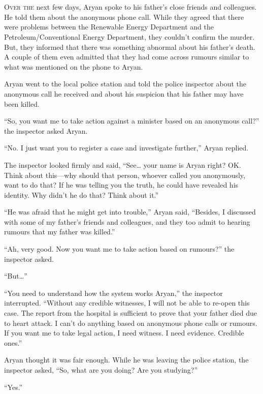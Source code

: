 \chapter{}

\lettrine{O}{ver the} next few days, Aryan spoke to his father's close friends and
colleagues. He told them about the anonymous phone call. While they agreed that
there were problems between the Renewable Energy Department and the
Petroleum/Conventional Energy Department, they couldn't confirm the murder. But,
they informed that there was something abnormal about his father's death. A
couple of them even admitted that they had come across rumours similar to what
was mentioned on the phone to Aryan.

Aryan went to the local police station and told the police inspector about the
anonymous call he received and about his suspicion that his father may have been
killed.

“So, you want me to take action against a minister based on an anonymous call?”
the inspector asked Aryan.

“No. I just want you to register a case and investigate further,” Aryan replied.

The inspector looked firmly and said, “See… your name is Aryan right? OK.
Think about this—why should that person, whoever called you anonymously, want
to do that? If he was telling you the truth, he could have revealed his
identity. Why didn't he do that? Think about it.”

“He was afraid that he might get into trouble,” Aryan said, “Besides, I
discussed with some of my father's friends and colleagues, and they too admit to
hearing rumours that my father was killed.”

“Ah, very good. Now you want me to take action based on rumours?” the inspector
asked.

“But…”

“You need to understand how the system works Aryan,” the inspector interrupted.
“Without any credible witnesses, I will not be able to re-open this case. The
report from the hospital is sufficient to prove that your father died due to
heart attack. I can't do anything based on anonymous phone calls or rumours. If
you want me to take legal action, I need witness. I need evidence. Credible
ones.”

Aryan thought it was fair enough. While he was leaving the police station, the
inspector asked, “So, what are you doing? Are you studying?”

“Yes.”


